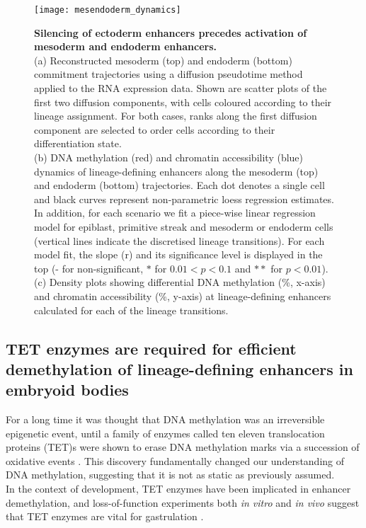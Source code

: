 \begin{figure}[H]
	\centering
	\texttt{[image: mesendoderm\_dynamics]}
	\caption[]{
	\textbf{Silencing of ectoderm enhancers precedes activation of mesoderm and endoderm enhancers.} \\
	(a) Reconstructed mesoderm (top) and endoderm (bottom) commitment trajectories using a diffusion pseudotime method applied to the RNA expression data. Shown are scatter plots of the first two diffusion components, with cells coloured according to their lineage assignment. For both cases, ranks along the first diffusion component are selected to order cells according to their differentiation state. \\
	(b) DNA methylation (red) and chromatin accessibility (blue) dynamics of lineage-defining enhancers along the mesoderm (top) and endoderm (bottom) trajectories. Each dot denotes a single cell and black curves represent non-parametric loess regression estimates. In addition, for each scenario we fit a piece-wise linear regression model for epiblast, primitive streak and mesoderm or endoderm cells (vertical lines indicate the discretised lineage transitions). For each model fit, the slope (r) and its significance level is displayed in the top (- for non-significant, $*$ for $0.01<p<0.1$ and $**$ for $p<0.01$).\\
	(c) Density plots showing differential DNA methylation (\%, x-axis) and chromatin accessibility (\%, y-axis) at lineage-defining enhancers calculated for each of the lineage transitions.
	}
	\label{fig:mesendoderm_dynamics}
\end{figure}


\subsection{TET enzymes are required for efficient demethylation of lineage-defining enhancers in embryoid bodies}

For a long time it was thought that DNA methylation was an irreversible epigenetic event, until a family of enzymes called ten eleven translocation proteins (TET)s were shown to erase DNA methylation marks via a succession of oxidative events \cite{Rasmussen2016}. This discovery fundamentally changed our understanding of DNA methylation, suggesting that it is not as static as previously assumed.\\
In the context of development, TET enzymes have been implicated in enhancer demethylation, and loss-of-function experiments both \textit{in vitro} and \textit{in vivo} suggest that TET enzymes are vital for gastrulation \cite{Dai2016,Sardina2018,Rasmussen2016,Li2016}.


